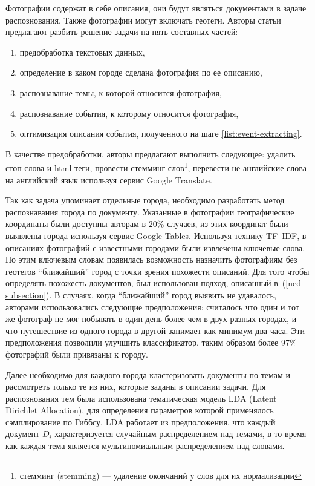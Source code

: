 \documentclass[12pt, a4paper]{article}
\begin{document}
  Фотографии содержат в себе описания, они будут являться документами в задаче распознования. Также фотографии могут включать геотеги. Авторы статьи предлагают разбить решение задачи на пять составных частей: 
  \begin{enumerate}
  \item предобработка текстовых данных,
  \item определение в каком городе сделана фотография по ее описанию,
  \item распознавание темы, к которой относится фотография,
  \item распознавание события, к которому относится фотография, \label{list:event-extracting}
  \item оптимизация описания события, полученного на шаге \ref{list:event-extracting}.
  \end{enumerate}
  
  В качестве предобработки, авторы предлагают выполнить следующее: удалить стоп-слова и html теги, провести стемминг слов\footnote{стемминг (stemming) --- удаление окончаний у слов для их нормализации}, перевести не английские слова на английский язык используя сервис Google Translate.
  
	Так как задача упоминает отдельные города, необходимо разработать метод распознавания города по документу. Указанные в фотографии географические координаты были доступны авторам в 20\% случаев, из этих координат были выявлены города используя сервис Google Tables. Используя технику TF--IDF, в описаниях фотографий с известными городами были извлечены ключевые слова. По этим ключевым словам появилась возможность назначить фотографиям без геотегов ``ближайший'' город с точки зрения похожести описаний. Для того чтобы определять похожесть документов, был использован подход, описанный в~(\ref{ned-subsection}). В случаях, когда ``ближайший'' город выявить не удавалось, авторами использовались следующие предположения: считалось что один и тот же фотограф не мог побывать в один день более чем в двух разных городах, и что путешествие из одного города в другой занимает как минимум два часа. Эти предположения позволили улучшить классификатор, таким образом более 97\% фотографий были привязаны к городу.
	
	Далее необходимо для каждого города кластеризовать документы по темам и рассмотреть только те из них, которые заданы в описании задачи. Для распознования тем была использована тематическая модель LDA (Latent Dirichlet Allocation)\cite{lda-model}, для определения параметров которой применялось сэмплирование по Гиббсу\cite{lda-gibbs}. LDA работает из предположения, что каждый документ $D_i$ характеризуется случайным распределением над темами, в то время как каждая тема является мультиномиальным распределением над словами.
	
\end{document}
